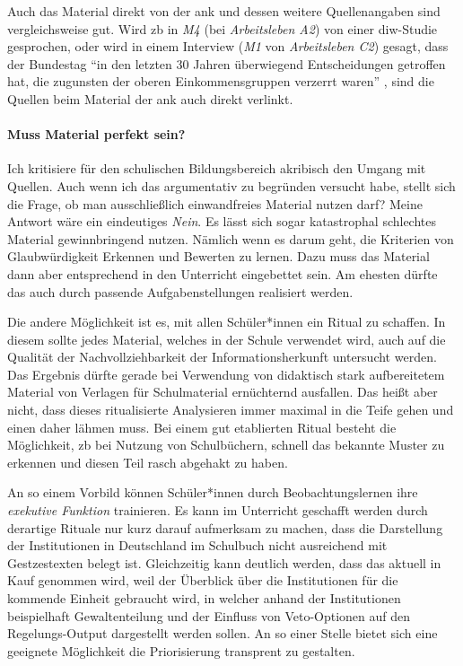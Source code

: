 Auch das Material direkt von der \gls{ank} und dessen weitere Quellenangaben sind vergleichsweise gut. Wird \gls{zb} in \emph{M4} (bei \emph{Arbeitsleben A2}) von einer \gls{diw}-Studie gesprochen, oder wird in einem Interview (\emph{M1} von \emph{Arbeitsleben C2}) gesagt, dass der Bundestag \enquote{in den letzten 30 Jahren überwiegend Entscheidungen getroffen hat, die zugunsten der oberen Einkommensgruppen verzerrt waren} \autocite{Elsasser.2017}, sind die Quellen beim Material der \gls{ank} auch direkt verlinkt. 

\paragraph{Muss Material perfekt sein?} 
Ich kritisiere für den schulischen Bildungsbereich akribisch den Umgang mit Quellen. Auch wenn ich das argumentativ zu begründen versucht habe, stellt sich die Frage, ob man ausschließlich einwandfreies Material nutzen darf?
Meine Antwort wäre ein eindeutiges \emph{Nein}. Es lässt sich sogar katastrophal schlechtes Material gewinnbringend nutzen. Nämlich wenn es darum geht, die Kriterien von Glaubwürdigkeit Erkennen und Bewerten zu lernen. Dazu muss das Material dann aber entsprechend in den Unterricht eingebettet sein. Am ehesten dürfte das auch durch passende Aufgabenstellungen realisiert werden. 

Die andere Möglichkeit ist es, mit allen Schüler*innen ein Ritual zu schaffen. In diesem sollte jedes Material, welches in der Schule verwendet wird, auch auf die Qualität der Nachvollziehbarkeit der Informationsherkunft untersucht werden. Das Ergebnis dürfte gerade bei Verwendung von didaktisch stark aufbereitetem Material von Verlagen für Schulmaterial ernüchternd ausfallen. Das heißt aber nicht, dass dieses ritualisierte Analysieren immer maximal in die Teife gehen und einen daher lähmen muss. Bei einem gut etablierten Ritual besteht die Möglichkeit, \gls{zb} bei Nutzung von Schulbüchern, schnell das bekannte Muster zu erkennen und diesen Teil rasch abgehakt zu haben. 

An so einem Vorbild können Schüler*innen durch Beobachtungslernen ihre \emph{exekutive Funktion} trainieren. Es kann im Unterricht geschafft werden durch derartige Rituale nur kurz darauf aufmerksam zu machen, dass die Darstellung der Institutionen in Deutschland im Schulbuch nicht ausreichend mit Gestzestexten belegt ist. Gleichzeitig kann deutlich werden, dass das aktuell in Kauf genommen wird, weil der Überblick über die Institutionen für die kommende Einheit gebraucht wird, in welcher anhand der Institutionen beispielhaft Gewaltenteilung und der Einfluss von Veto-Optionen auf den Regelungs-Output dargestellt werden sollen. An so einer Stelle bietet sich eine geeignete Möglichkeit die Priorisierung transprent zu gestalten. 
\bigskip 

